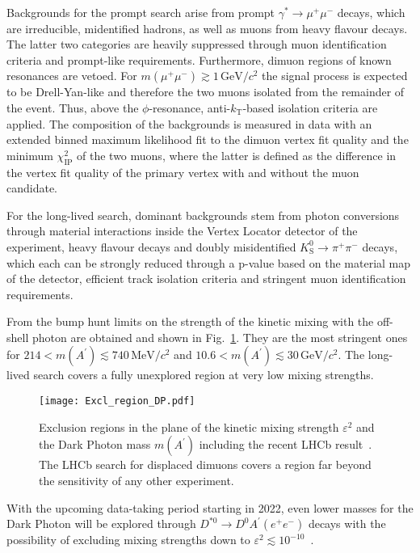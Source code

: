 \documentclass[a4paper,11pt]{article}
\begin{document}
Backgrounds for the prompt search arise from prompt $\gamma^*\to\mu^+\mu^-$ decays, which are irreducible, midentified hadrons, as well as muons from heavy flavour decays. The latter two categories are heavily suppressed through muon identification criteria and prompt-like requirements. Furthermore, dimuon regions of known resonances are vetoed. For $m(\mu^+\mu^-)\gtrsim 1\,\text{GeV}/c^2$ the signal process is expected to be Drell-Yan-like and therefore the two muons isolated from the remainder of the event. Thus, above the $\phi$-resonance, anti-$k_\text{T}$-based isolation criteria are applied. The composition of the backgrounds is measured in data with an extended binned maximum likelihood fit to the dimuon vertex fit quality and the minimum $\chi^2_{\text{IP}}$ of the two muons, where the latter is defined as the difference in the vertex fit quality of the primary vertex with and without the muon candidate.

For the long-lived search, dominant backgrounds stem from photon conversions through material interactions inside the Vertex Locator detector of the experiment, heavy flavour decays and doubly misidentified $K^0_\text{S}\to\pi^+\pi^-$ decays, which each can be strongly reduced through a p-value based on the material map of the detector, efficient track isolation criteria and stringent muon identification requirements.

From the bump hunt limits on the strength of the kinetic mixing with the off-shell photon are obtained and shown in Fig.~\ref{fig:dark_photon}. They are the most stringent ones for $214<m(A^\prime)\lesssim740\,\text{MeV}/c^2$ and $10.6<m(A^\prime)\lesssim30\,\text{GeV}/c^2$. The long-lived search covers a fully unexplored region at very low mixing strengths.
\begin{figure}
\centering
\texttt{[image: Excl\_region\_DP.pdf]}
\caption{Exclusion regions in the plane of the kinetic mixing strength $\varepsilon^2$ and the Dark Photon mass $m(A^\prime)$ including the recent LHCb result~\cite{DarkPhoton2}. The LHCb search for displaced dimuons covers a region far beyond the sensitivity of any other experiment.}
\label{fig:dark_photon}
\end{figure}
With the upcoming data-taking period starting in 2022, even lower masses for the Dark Photon will be explored through $D^{*0}\to D^0A^\prime(e^+e^-)$ decays with the possibility of excluding mixing strengths down to $\varepsilon^2\lesssim10^{-10}$~\cite{DarkPhoton_e}.
\end{document}
